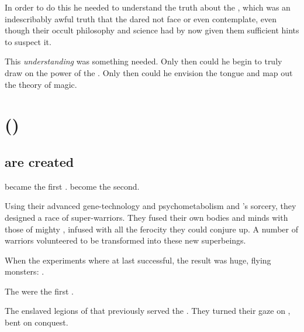In order to do this he needed to understand the truth about the , which was an indescribably awful truth that the \ophidians dared not face or even contemplate, even though their occult philosophy and science had by now given them sufficient hints to suspect it. 

This \emph{understanding} was something \Sethicus needed.
Only then could he begin to truly draw on the power of the \xss.
Only then could he envision the \TrueDraconic tongue and map out the \draconic theory of magic.







\section{\Sethicus ()}
\subsection{\Dragons are created}
\Sethicus became the first \dragon.
\Tiamat become the second.

Using their advanced gene-technology and psychometabolism and \Sethicus's \xsic{} sorcery, they designed a race of \ophidian{} super-warriors. 
They fused their own \ophidian bodies and minds with those of mighty , infused with all the \xsic{} ferocity they could conjure up. 
A number of \ophidian{} warriors volunteered to be transformed into these new superbeings. 

When the experiments where at last successful, the result was huge, flying monsters: 
\Dragons. 

The \dragons were the first . 

The \dragons{} enslaved legions of \daemons{} that previously served the \xzaishanns. 
They turned their gaze on \Miith{}, bent on conquest.


